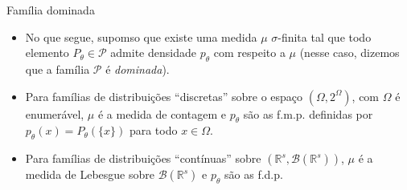 \documentclass[11pt]{beamer}
\newenvironment{halfwideitemize}{\itemize\addtolength{\itemsep}{0.5em}}{\enditemize}
\begin{document}
	\begin{frame}{Família dominada}
		\begin{itemize}
			\item No que segue, supomso que existe uma medida $\mu$ $\sigma$-finita tal que todo elemento $P_\theta \in \mathcal{P}$ admite densidade $p_\theta$ com respeito a $\mathcal{\mu}$ (nesse caso, dizemos que a família $\mathcal{P}$ é \emph{dominada}).
			\begin{halfwideitemize}
				\item Para famílias de distribuições ``discretas'' sobre o espaço $(\Omega,2^\Omega)$, com $\Omega$ é enumerável, $\mu$ é a medida de contagem e $p_\theta$ são as f.m.p. definidas por $p_{\theta}(x) = P_{\theta}(\{x\})$ para todo $x \in \Omega$.
				\item Para famílias de distribuições ``contínuas'' sobre $(\mathbb{R}^s, \mathcal{B}(\mathbb{R}^s))$, $\mathcal{\mu}$ é a medida de Lebesgue sobre $\mathcal{B}(\mathbb{R}^s)$ e $p_\theta$ são as f.d.p.
			\end{halfwideitemize}

	
			\end{itemize}
	\end{frame}
\end{document}
